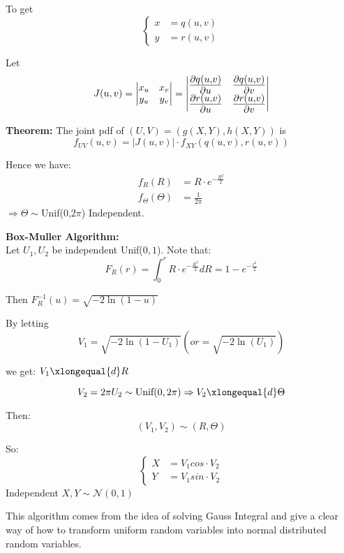 \documentclass{article}
\begin{document}
To get
\[
\left\{
    \begin{aligned}
        x &= q(u,v)\\
        y &= r(u,v)
    \end{aligned}
\right.
\]


Let 
\[
J(u,v) = \begin{vmatrix}
    x_{u} & x_{v} \\
    y_{u} & y_{v}
   \end{vmatrix}
   ={ \Large \begin{vmatrix}
    \frac{\partial q(u,v)}{\partial u} & \frac{\partial q(u,v)}{\partial v} \\
    \frac{\partial r(u,v)}{\partial u} & \frac{\partial r(u,v)}{\partial v}
   \end{vmatrix}}
\]  

\bigskip

\textbf{Theorem:} The joint pdf of $(U,V) = (g(X,Y),h(X,Y))$ is 
\[ f_{UV}(u,v) = |J(u,v)| \cdot f_{XY}(q(u,v),r(u,v)) \]

Hence we have:
\begin{align*}
    f_{R}(R) &= R \cdot e^{-\frac{R^{2}}{2}}\\
    f_{\Theta}(\Theta) &= \frac{1}{2\pi}
\end{align*}
$\Rightarrow \Theta \sim $Unif(0,$2\pi$) Independent.

\begin{definition}
    \textbf{Box-Muller Algorithm:}\\
    Let $U_{1} , U_{2}$ be independent Unif($0,1$). Note that:
    \[ F_{R}(r) = \int_{0}^{r} R\cdot e^{-\frac{R^{2}}{2}} dR = 1-e^{-\frac{r^{2}}{2}} \]
    
    Then $F_{R}^{-1}(u) = \sqrt{-2\ln(1-u)}$
    
    By letting \[ V_{1} = \sqrt{-2\ln(1-U_{1})} \left( or  = \sqrt{-2\ln(U_{1})}\right) \]
    
    we get: $V_{1} \xlongequal{d} R$
    
    \[ V_{2} = 2\pi U_{2} \sim \text{Unif}(0,2\pi) \Rightarrow V_{2} \xlongequal{d} \Theta \]
    
    Then:\[ (V_{1},V_{2} ) \sim (R,\Theta) \]
    
    So:
    \[
    \left\{
        \begin{aligned}
            X &= V_{1} cos\cdot V_{2}\\
            Y &= V_{1} sin\cdot V_{2} 
        \end{aligned}
    \right.
    \]
    Independent \quad $X,Y \sim \mathcal{N}(0,1) $ 
\end{definition}
This algorithm comes from the idea of solving Gauss Integral and give a clear way of how to transform uniform random variables into normal distributed random variables.
\end{document}
